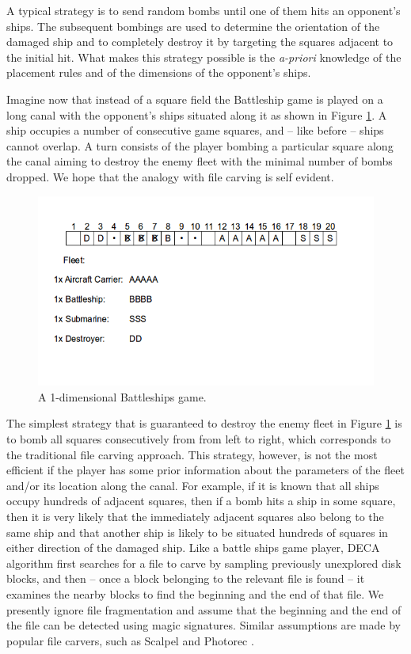 \documentclass[10pt,a4paper]{article}
\begin{document}
A typical strategy is to send random bombs until one of them hits an opponent's ships. The subsequent bombings are used to determine the orientation of the damaged ship and to completely destroy it by targeting the  squares adjacent to the initial hit. What makes this strategy possible is the \emph{a-priori} knowledge of  the placement rules and of the dimensions of the opponent's ships.

Imagine now that instead of a square field the Battleship game is played on a long canal with the opponent's ships situated along it as shown in Figure \ref{fig:battleships_on_a_canal}. A ship occupies a number of consecutive game squares, and -- like before -- ships cannot overlap. A turn consists of the player bombing a particular square along the canal aiming to destroy the enemy fleet with the minimal number of bombs dropped. We hope that the analogy with file carving is self evident. 

\begin{figure}
  \centerline{\includegraphics[width=\textwidth]{fig3}}
  \caption{A 1-dimensional Battleships game.}
  \label{fig:battleships_on_a_canal}
\end{figure}

The simplest strategy that is guaranteed to destroy the enemy fleet in Figure \ref{fig:battleships_on_a_canal} is to bomb all squares consecutively from from left to right, which corresponds to the traditional file carving approach. This strategy, however, is not the most efficient if the player has some prior information about the parameters of the fleet and/or its location along the canal. For example, if it is known that all ships occupy hundreds of adjacent squares, then if a bomb hits a ship in some square, then it is very likely that the immediately adjacent squares also belong to the same ship and that another ship is likely to be situated hundreds of squares in either direction of the damaged ship. Like a battle ships game player, DECA algorithm first searches for a file to carve by sampling previously unexplored disk blocks, and then -- once a block belonging to the relevant file is found -- it examines the nearby blocks to find the beginning and the end of that file. We presently ignore file fragmentation and assume that the beginning and the end of the file can be detected using magic signatures. Similar assumptions are made by popular file carvers, such as Scalpel \cite{richard2005scalpel} and Photorec \cite{grenier2007photorec}.
\end{document}
